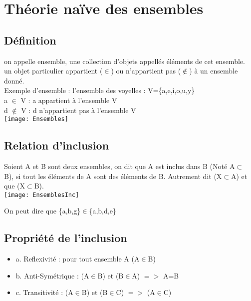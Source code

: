 \newpage

\chapter{Théorie naïve des ensembles}
\vspace{4mm} %

\section{Définition}

on appelle ensemble, une collection d'objets appellés éléments de cet ensemble.\\
un objet particulier appartient ($\in$) ou n'appartient pas ($\notin$) à un ensemble donné.\\

Exemple d'ensemble : l'ensemble des voyelles : V=\{a,e,i,o,u,y\} \\

a $\in$ V : a appartient à l'ensemble V \\
d $\notin$ V : d n'appartient pas à l'ensemble V \\

\texttt{[image: Ensembles]}
\vspace{3mm} %

\section{Relation d'inclusion}

Soient A et B sont deux ensembles, on dit que A est inclus dans B (Noté A$\subset$ B), si tout les éléments de A sont des éléments de B.
Autrement dit (X$\subset$A) et que (X$\subset$B).\\

\texttt{[image: EnsemblesInc]}
\vspace{3mm} %

On peut dire que \{a,b,g\}$\in$\{a,b,d,e\} \\

\section{Propriété de l'inclusion}

\begin{itemize}
\item {a. Reflexivité : pour tout ensemble A (A$\in$B)}
\item {b. Anti-Symétrique : (A$\in$B) et (B$\in$A) $=>$ A=B}
\item {c. Transitivité : (A$\in$B) et (B$\in$C) $=>$ (A$\in$C)}
\end{itemize}

